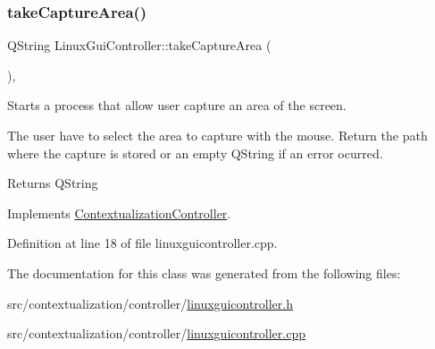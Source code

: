 \subsubsection{\texorpdfstring{take\+Capture\+Area()}{takeCaptureArea()}}
{\footnotesize\ttfamily Q\+String Linux\+Gui\+Controller\+::take\+Capture\+Area (\begin{DoxyParamCaption}{ }\end{DoxyParamCaption})\hspace{0.3cm}{\ttfamily [override]}, {\ttfamily [virtual]}}



Starts a process that allow user capture an area of the screen. 

The user have to select the area to capture with the mouse. Return the path where the capture is stored or an empty Q\+String if an error ocurred. \begin{DoxyReturn}{Returns}
Q\+String 
\end{DoxyReturn}


Implements \mbox{\hyperlink{classContextualizationController_a121919886590cd4955bbcc2d8b747b26}{Contextualization\+Controller}}.



Definition at line 18 of file linuxguicontroller.\+cpp.



The documentation for this class was generated from the following files\+:\begin{DoxyCompactItemize}
\item 
src/contextualization/controller/\mbox{\hyperlink{linuxguicontroller_8h}{linuxguicontroller.\+h}}\item 
src/contextualization/controller/\mbox{\hyperlink{linuxguicontroller_8cpp}{linuxguicontroller.\+cpp}}\end{DoxyCompactItemize}
